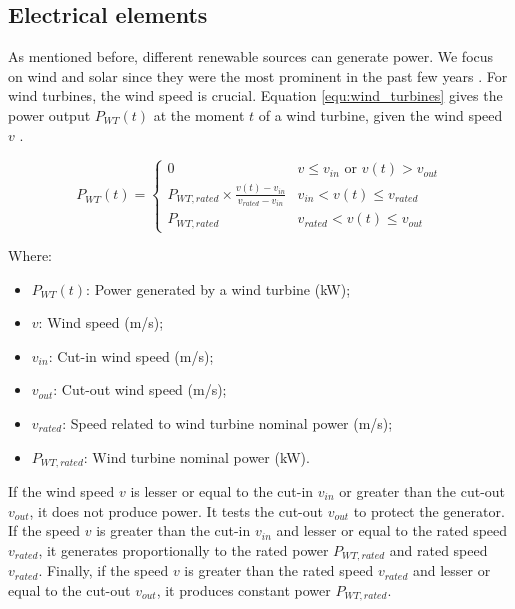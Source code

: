 
\subsection{Electrical elements}
\label{sec:related_work_electrical_elements}
As mentioned before, different renewable sources can generate power. We focus on wind and solar since they were the most prominent in the past few years \cite{renewables2022}. For wind turbines, the wind speed is crucial. Equation \ref{equ:wind_turbines} gives the power output $P_{WT}(t)$ at the moment $t$ of a wind turbine, given the wind speed $v$ \cite{garcia2006wind, dong2016optimal, maleki2015optimal}.

\begin{equation}
    \label{equ:wind_turbines}
    P_{WT}(t) = \begin{cases}
        0 & v \leq v_{in} \text{ or } v(t) > v_{out} \\
        P_{WT,rated} \times \frac{v(t) - v_{in}}{v_{rated} - v_{in}} & v_{in} < v(t) \leq v_{rated} \\
        P_{WT,rated} & v_{rated} < v(t) \leq v_{out}
    \end{cases}
\end{equation}

Where:
\begin{itemize}
    \item $P_{WT}(t)$: Power generated by a wind turbine (kW);
    \item $v$: Wind speed (m/s);
    \item $v_{in}$: Cut-in wind speed (m/s);
    \item $v_{out}$: Cut-out wind speed (m/s);
    \item $v_{rated}$: Speed related to wind turbine nominal power (m/s);
    \item $P_{WT,rated}$: Wind turbine nominal power (kW).
\end{itemize}

If the wind speed $v$ is lesser or equal to the cut-in $v_{in}$  or greater than the cut-out $v_{out}$, it does not produce power. It tests the cut-out $v_{out}$ to protect the generator. If the speed $v$ is greater than the cut-in $v_{in}$ and lesser or equal to the rated speed $v_{rated}$, it generates proportionally to the rated power $P_{WT,rated}$ and rated speed $v_{rated}$. Finally, if the speed $v$ is greater than the rated speed $v_{rated}$ and lesser or equal to the cut-out $v_{out}$, it produces constant power $P_{WT,rated}$. 

